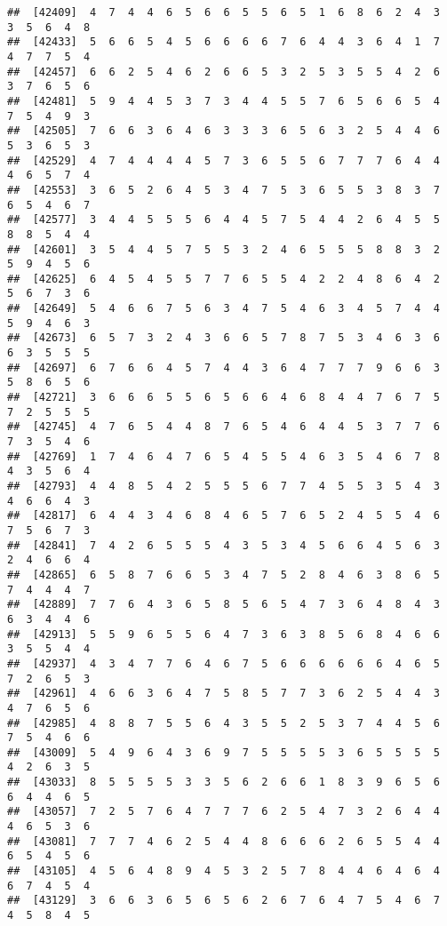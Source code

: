 \documentclass[
]{book}
\begin{document}
\begin{verbatim}
##  [42409]  4  7  4  4  6  5  6  6  5  5  6  5  1  6  8  6  2  4  3  3  5  6  4  8
##  [42433]  5  6  6  5  4  5  6  6  6  6  7  6  4  4  3  6  4  1  7  4  7  7  5  4
##  [42457]  6  6  2  5  4  6  2  6  6  5  3  2  5  3  5  5  4  2  6  3  7  6  5  6
##  [42481]  5  9  4  4  5  3  7  3  4  4  5  5  7  6  5  6  6  5  4  7  5  4  9  3
##  [42505]  7  6  6  3  6  4  6  3  3  3  6  5  6  3  2  5  4  4  6  5  3  6  5  3
##  [42529]  4  7  4  4  4  4  5  7  3  6  5  5  6  7  7  7  6  4  4  4  6  5  7  4
##  [42553]  3  6  5  2  6  4  5  3  4  7  5  3  6  5  5  3  8  3  7  6  5  4  6  7
##  [42577]  3  4  4  5  5  5  6  4  4  5  7  5  4  4  2  6  4  5  5  8  8  5  4  4
##  [42601]  3  5  4  4  5  7  5  5  3  2  4  6  5  5  5  8  8  3  2  5  9  4  5  6
##  [42625]  6  4  5  4  5  5  7  7  6  5  5  4  2  2  4  8  6  4  2  5  6  7  3  6
##  [42649]  5  4  6  6  7  5  6  3  4  7  5  4  6  3  4  5  7  4  4  5  9  4  6  3
##  [42673]  6  5  7  3  2  4  3  6  6  5  7  8  7  5  3  4  6  3  6  6  3  5  5  5
##  [42697]  6  7  6  6  4  5  7  4  4  3  6  4  7  7  7  9  6  6  3  5  8  6  5  6
##  [42721]  3  6  6  6  5  5  6  5  6  6  4  6  8  4  4  7  6  7  5  7  2  5  5  5
##  [42745]  4  7  6  5  4  4  8  7  6  5  4  6  4  4  5  3  7  7  6  7  3  5  4  6
##  [42769]  1  7  4  6  4  7  6  5  4  5  5  4  6  3  5  4  6  7  8  4  3  5  6  4
##  [42793]  4  4  8  5  4  2  5  5  5  6  7  7  4  5  5  3  5  4  3  4  6  6  4  3
##  [42817]  6  4  4  3  4  6  8  4  6  5  7  6  5  2  4  5  5  4  6  7  5  6  7  3
##  [42841]  7  4  2  6  5  5  5  4  3  5  3  4  5  6  6  4  5  6  3  2  4  6  6  4
##  [42865]  6  5  8  7  6  6  5  3  4  7  5  2  8  4  6  3  8  6  5  7  4  4  4  7
##  [42889]  7  7  6  4  3  6  5  8  5  6  5  4  7  3  6  4  8  4  3  6  3  4  4  6
##  [42913]  5  5  9  6  5  5  6  4  7  3  6  3  8  5  6  8  4  6  6  3  5  5  4  4
##  [42937]  4  3  4  7  7  6  4  6  7  5  6  6  6  6  6  6  4  6  5  7  2  6  5  3
##  [42961]  4  6  6  3  6  4  7  5  8  5  7  7  3  6  2  5  4  4  3  4  7  6  5  6
##  [42985]  4  8  8  7  5  5  6  4  3  5  5  2  5  3  7  4  4  5  6  7  5  4  6  6
##  [43009]  5  4  9  6  4  3  6  9  7  5  5  5  5  3  6  5  5  5  5  4  2  6  3  5
##  [43033]  8  5  5  5  5  3  3  5  6  2  6  6  1  8  3  9  6  5  6  6  4  4  6  5
##  [43057]  7  2  5  7  6  4  7  7  7  6  2  5  4  7  3  2  6  4  4  4  6  5  3  6
##  [43081]  7  7  7  4  6  2  5  4  4  8  6  6  6  2  6  5  5  4  4  6  5  4  5  6
##  [43105]  4  5  6  4  8  9  4  5  3  2  5  7  8  4  4  6  4  6  4  6  7  4  5  4
##  [43129]  3  6  6  3  6  5  6  5  6  2  6  7  6  4  7  5  4  6  7  4  5  8  4  5

\end{verbatim}
\end{document}
